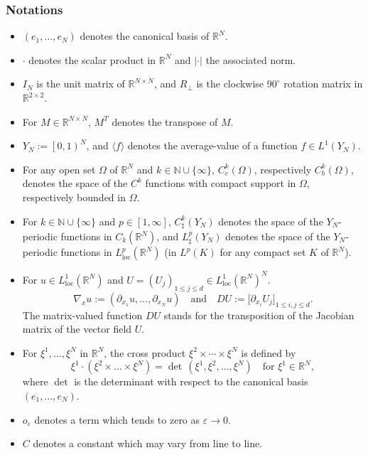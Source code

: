 \documentclass[JEP,XML,SOM,Unicode]{cedram}
\newcommand{\loc}{\mathrm{loc}}
\let \Om \Omega
\def \NN {\mathbb N}
\def \RR {\mathbb R}
\theoremstyle{plain}
\theoremstyle{definition}
\begin{document}
\skpt
\subsubsection*{Notations}
\begin{itemize}
\item $\left(e_1,\dots,e_N\right)$ denotes the canonical basis of $\RR^N$.
\item $\cdot$ denotes the scalar product in $\RR^N$ and $|\cdot|$ the associated norm.
\item $I_N$ is the unit matrix of $\RR^{N\times N}$, and $R_\perp$ is the clockwise $90^\circ$ rotation matrix in $\RR^{2\times 2}$.
\item For $M\in\RR^{N\times N}$, $M^T$ denotes the transpose of $M$.
\item $Y_N:=\left[0,1\right)^N$, and $\langle f\rangle$ denotes the average-value of a function $f\in L^1(Y_N)$.

\item For any open set $\Om$ of $\RR^N$ and $k\in\NN\cup\{\infty\}$, $C^k_c(\Om)$, respectively $C^k_b(\Om)$, denotes the space of the $C^k$ functions with compact support in $\Om$, respectively bounded in $\Om$.
\item For $k\in\NN\cup\{\infty\}$ and $p\in[1,\infty]$, $C^k_\sharp(Y_N)$ denotes the space of the $Y_N$-periodic functions in $C_k(\RR^N)$, and $L^p_\sharp(Y_N)$ denotes the space of the $Y_N$-periodic functions in $L^p_\loc(\RR^N)$ (\ie in $L^p(K)$ for any compact set $K$ of $\RR^N$).
\item For $u\in L^1_\loc(\RR^N)$ and $U=(U_j)_{1\leq j\leq d}\in L^1_\loc(\RR^N)^N$.
\[
\nabla_x u:=\left(\partial_{x_1}u,\dots,\partial_{x_N}u\right)\quad\mbox{and}\quad DU:=\big[\partial_{x_i}U_j\big]_{1\leq i,j\leq d}.
\]
The matrix-valued function $DU$ stands for the transposition of the Jacobian matrix of the vector field $U$.
\item For $\xi^1,\dots,\xi^N$ in $\RR^N$, the cross product $\xi^2\times\cdots\times \xi^N$ is defined by
\begin{equation}\label{crpr}
\xi^1\cdot(\xi^2\times\dots\times \xi^N)=\det\,(\xi^1,\xi^2,\dots,\xi^N)\quad\mbox{for }\xi^1\in\RR^N,
\end{equation}
where $\det$ is the determinant with respect to the canonical basis $(e_1,\dots,e_N)$.
\item $o_\varepsilon$ denotes a term which tends to zero as $\varepsilon\to 0$.
\item $C$ denotes a constant which may vary from line to line.
\end{itemize}
\end{document}
